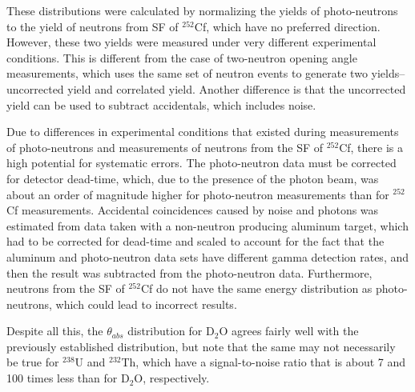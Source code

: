 These distributions were calculated by normalizing the yields of photo-neutrons to the yield of neutrons from SF of $^{252}$Cf, which have no preferred direction.
However, these two yields were measured under very different experimental conditions.
This is different from the case of two-neutron opening angle measurements, which uses the same set of neutron events to generate two yields--uncorrected yield and correlated yield.
Another difference is that the uncorrected yield can be used to subtract accidentals, which includes noise.

 Due to differences in experimental conditions that existed during measurements of photo-neutrons and measurements of neutrons from the SF of $^{252}$Cf, there is a high potential for systematic errors.
The photo-neutron data must be corrected for detector dead-time, which, due to the presence of the photon beam, was about an order of magnitude higher for photo-neutron measurements than for $^{252}$Cf measurements.
Accidental coincidences caused by noise and photons was estimated from data taken with a non-neutron producing aluminum target, which had to be corrected for dead-time and scaled to account for the fact that the aluminum and photo-neutron data sets have different gamma detection rates, and then the result was subtracted from the photo-neutron data.
Furthermore, neutrons from the SF of $^{252}$Cf do not have the same energy distribution as photo-neutrons, which could lead to incorrect results.

Despite all this, the $\theta_{abs}$ distribution for D$_{2}$O agrees fairly well with the previously established distribution, but note that the same may not necessarily be true for $^{238}$U and $^{232}$Th, which have a signal-to-noise ratio that is about 7 and 100 times less than for D$_{2}$O, respectively.

